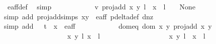 \begin{isabellebody}
\ e{\isacharunderscore}aff{\isacharunderscore}{}{\isacharunderscore}def\ \isamarkupfalse%
\ simp\isanewline
\ \ \ \ \ \ \ \ \ \ \isamarkupfalse%
\ v{}{\isacharcolon}\ {\isachardoublequoteopen}proj{\isacharunderscore}add\ {\isacharparenleft}{\isacharparenleft}x{\isacharcomma}\ y{\isacharparenright}{\isacharcomma}\ l{\isacharparenright}\ {\isacharparenleft}{\isasymtau}\ {\isacharparenleft}x{\isacharprime}{\isacharcomma}\ {}{\isacharparenright}{\isacharcomma}\ l{\isacharprime}\ {\isacharplus}\ {}{\isacharparenright}\ {\isacharequal}\ None{\isachardoublequoteclose}\isanewline
\ \ \ \ \ \ \ \ \ \ \ \ \isamarkupfalse%
{\isacharparenleft}simp\ add{\isacharcolon}\ proj{\isacharunderscore}add{\isachardot}simps\ {\isacartoucheopen}{\isacharparenleft}x{\isacharcomma}y{\isacharparenright}\ {\isasymin}\ e{\isacharunderscore}aff{\isacartoucheclose}\ p{\isacharunderscore}delta{\isacharunderscore}def\ d{\isacharunderscore}{}{\isacharunderscore}nz{\isacharparenright}\isanewline
\ \ \ \ \ \ \ \ \ \ \ \ \isamarkupfalse%
{\isacharparenleft}simp\ add{\isacharcolon}\ {\isacartoucheopen}{\isacharparenleft}{}\ {\isacharslash}\ {\isacharparenleft}t\ {\isacharasterisk}\ x{\isacharprime}{\isacharparenright}{\isacharcomma}{}{\isacharparenright}\ {\isasymnotin}\ e{\isacharunderscore}aff{\isacartoucheclose}{\isacharparenright}\isanewline
\ \ \ \ \ \ \ \ \ \ \isamarkupfalse%
\ dom{\isacharunderscore}eq{\isacharcolon}\ {\isachardoublequoteopen}{\isacharparenleft}dom\ {\isacharparenleft}{\isasymlambda}{\isacharparenleft}x{\isacharcomma}\ y{\isacharparenright}{\isachardot}\ proj{\isacharunderscore}add\ x\ y{\isacharparenright}\ {\isasyminter}\isanewline
\ \ \ \ \ \ \ \ \ \ \ \ \ \ \ \ \ \ {\isacharbraceleft}{\isacharparenleft}{\isacharparenleft}{\isacharparenleft}x{\isacharcomma}\ y{\isacharparenright}{\isacharcomma}\ l{\isacharparenright}{\isacharcomma}\ {\isacharparenleft}x{\isacharprime}{\isacharcomma}\ {}{\isacharparenright}{\isacharcomma}\ l{\isacharprime}{\isacharparenright}{\isacharcomma}\isanewline
\ \ \ \ \ \ \ \ \ \ \ \ \ \ \ \ \ \ \ {\isacharparenleft}{\isacharparenleft}{\isacharparenleft}x{\isacharcomma}\ y{\isacharparenright}{\isacharcomma}\ l{\isacharparenright}{\isacharcomma}\ {\isasymtau}\ {\isacharparenleft}x{\isacharprime}{\isacharcomma}\ {}{\isacharparenright}{\isacharcomma}\ l{\isacharprime}\ {\isacharplus}\ {}{\isacharparenright}{\isacharbraceright}{\isacharparenright}\ {\isacharequal}\ \isanewline

\end{isabellebody}
